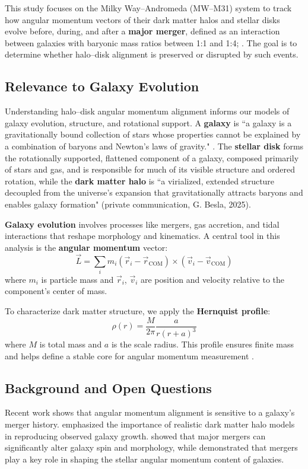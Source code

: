 \documentclass[twocolumn]{aastex631}
\begin{document}
This study focuses on the Milky Way–Andromeda (MW–M31) system to track how angular momentum vectors of their dark matter halos and stellar disks evolve before, during, and after a \textbf{major merger}, defined as an interaction between galaxies with baryonic mass ratios between 1:1 and 1:4; \citep{Lotz2011}. The goal is to determine whether halo–disk alignment is preserved or disrupted by such events.

\subsection{Relevance to Galaxy Evolution}

Understanding halo–disk angular momentum alignment informs our models of galaxy evolution, structure, and rotational support. A \textbf{galaxy} is ``a galaxy is a gravitationally bound collection of stars whose properties cannot be explained by a combination of baryons and Newton’s laws of gravity." \citep{Willman2012}. The \textbf{stellar disk} forms the rotationally supported, flattened component of a galaxy, composed primarily of stars and gas, and is responsible for much of its visible structure and ordered rotation, while the \textbf{dark matter halo} is ``a virialized, extended structure decoupled from the universe’s expansion that gravitationally attracts baryons and enables galaxy formation" (private communication, G. Besla, 2025).

\textbf{Galaxy evolution} involves processes like mergers, gas accretion, and tidal interactions that reshape morphology and kinematics. A central tool in this analysis is the \textbf{angular momentum} vector:
\[
\vec{L} = \sum_i m_i (\vec{r}_i - \vec{r}_{\text{COM}}) \times (\vec{v}_i - \vec{v}_{\text{COM}})
\]
where $m_i$ is particle mass and $\vec{r}_i$, $\vec{v}_i$ are position and velocity relative to the component’s center of mass.

To characterize dark matter structure, we apply the \textbf{Hernquist profile}:
\[
\rho(r) = \frac{M}{2\pi} \frac{a}{r(r+a)^3}
\]
where $M$ is total mass and $a$ is the scale radius. This profile ensures finite mass and helps define a stable core for angular momentum measurement \citep{Hernquist1990}.

\subsection{Background and Open Questions}

Recent work shows that angular momentum alignment is sensitive to a galaxy’s merger history. \citet{Somerville2008} emphasized the importance of realistic dark matter halo models in reproducing observed galaxy growth. \citet{RodriguezGomez2017} showed that major mergers can significantly alter galaxy spin and morphology, while \citet{Lagos2018} demonstrated that mergers play a key role in shaping the stellar angular momentum content of galaxies.
\end{document}
